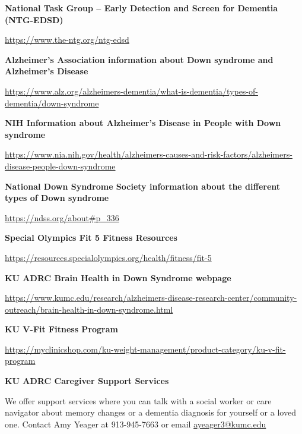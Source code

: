 

\textbf{National Task Group – Early Detection and Screen for Dementia (NTG-EDSD)}

\url{https://www.the-ntg.org/ntg-edsd}

\textbf{Alzheimer’s Association information about Down syndrome and Alzheimer’s Disease}

\url{https://www.alz.org/alzheimers-dementia/what-is-dementia/types-of-dementia/down-syndrome}

\textbf{NIH Information about Alzheimer’s Disease in People with Down syndrome}

\url{https://www.nia.nih.gov/health/alzheimers-causes-and-risk-factors/alzheimers-disease-people-down-syndrome}

\textbf{National Down Syndrome Society information about the different types of Down syndrome}

\url{https://ndss.org/about#p_336}

\textbf{Special Olympics Fit 5 Fitness Resources}

\url{https://resources.specialolympics.org/health/fitness/fit-5}

\textbf{KU ADRC Brain Health in Down Syndrome webpage} 

\url{https://www.kumc.edu/research/alzheimers-disease-research-center/community-outreach/brain-health-in-down-syndrome.html}

\textbf{KU V-Fit Fitness Program}

\url{https://myclinicshop.com/ku-weight-management/product-category/ku-v-fit-program}

\textbf{KU ADRC Caregiver Support Services}

We offer support services where you can talk with a social worker or care navigator about memory changes or a dementia diagnosis for yourself or a loved one. Contact Amy Yeager at 913-945-7663 or email \href{mailto:ayeager3@kumc.edu}{ayeager3@kumc.edu}
